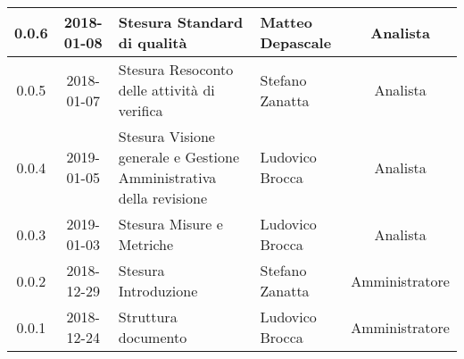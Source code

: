 \begin{center}
\begin{tabularx}{\textwidth}{|c|c|X|X|c|}
			\hline
			0.0.6 & 2018-01-08 & Stesura Standard di qualità & Matteo Depascale & Analista\\
			\hline
			0.0.5 & 2018-01-07 & Stesura Resoconto delle attività di verifica & Stefano Zanatta & Analista\\
			\hline
			0.0.4 & 2019-01-05 & Stesura Visione generale e Gestione Amministrativa della revisione  & Ludovico Brocca& Analista\\
			\hline	
			0.0.3 & 2019-01-03& Stesura Misure e Metriche &Ludovico Brocca & Analista\\
			\hline
			0.0.2 & 2018-12-29 & Stesura Introduzione & Stefano Zanatta & Amministratore\\
			\hline
			0.0.1 & 2018-12-24 & Struttura documento & Ludovico Brocca & Amministratore\\
			\hline
		\end{tabularx}
	\end{center}
\newpage